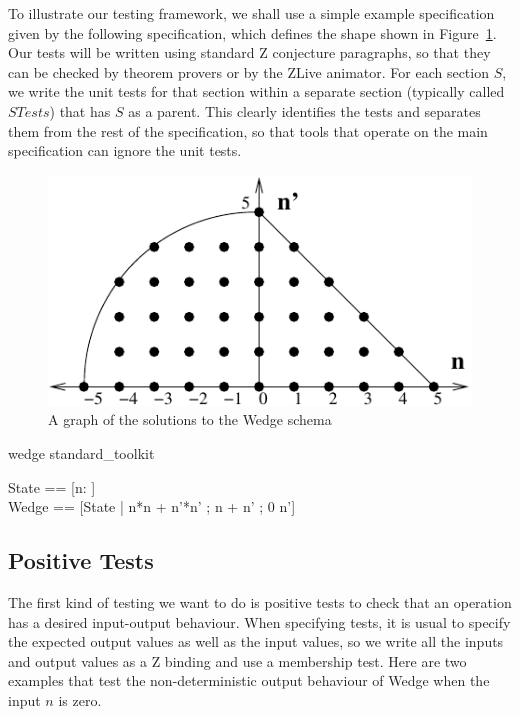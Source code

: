 \documentclass{llncs}
\begin{document}
To illustrate our testing framework, we shall use a simple example
specification given by the following specification, which defines the
shape shown in Figure~\ref{fig:wedge}.  Our tests will be written
using standard Z conjecture paragraphs, so that they can be checked by
theorem provers or by the ZLive animator.  For each section $S$, we
write the unit tests for that section within a separate section
(typically called $STests$) that has $S$ as a parent.  This clearly
identifies the tests and separates them from the rest of the
specification, so that tools that operate on the main specification
can ignore the unit tests.

\begin{figure}[htbp]
  \centering
  \includegraphics{wedge}
  \caption{A graph of the solutions to the Wedge schema}
  \label{fig:wedge}
\end{figure}

\begin{zsection}
  \SECTION wedge \parents standard\_toolkit
\end{zsection}
\begin{zed}
  State == [n:  ] \\
  Wedge == [\Delta State | n*n + n'*n' ; n + n' ; 0 \leq n']
\end{zed}

\subsection{Positive Tests}

The first kind of testing we want to do is positive tests to check
that an operation has a desired input-output behaviour.  When
specifying tests, it is usual to specify the expected output
values as well as the input values, so we write all the inputs and
output values as a Z binding and use a membership test.  Here are two
examples that test the non-deterministic output behaviour of Wedge
when the input $n$ is zero.  
\end{document}
